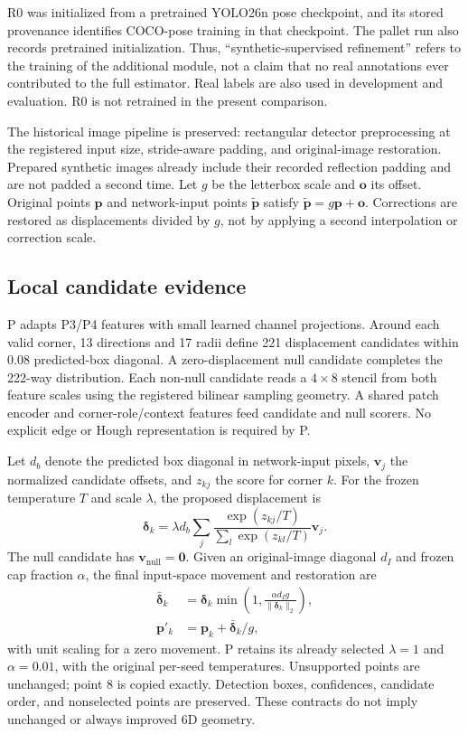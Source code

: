 \documentclass[journal]{IEEEtran}
\begin{document}
R0 was initialized from a pretrained YOLO26n pose checkpoint, and its stored provenance identifies COCO-pose training in that checkpoint. The pallet run also records pretrained initialization. Thus, ``synthetic-supervised refinement'' refers to the training of the additional module, not a claim that no real annotations ever contributed to the full estimator. Real labels are also used in development and evaluation. R0 is not retrained in the present comparison.

The historical image pipeline is preserved: rectangular detector preprocessing at the registered input size, stride-aware padding, and original-image restoration. Prepared synthetic images already include their recorded reflection padding and are not padded a second time. Let $g$ be the letterbox scale and $\mathbf{o}$ its offset. Original points $\mathbf{p}$ and network-input points $\tilde{\mathbf{p}}$ satisfy $\tilde{\mathbf{p}}=g\mathbf{p}+\mathbf{o}$. Corrections are restored as displacements divided by $g$, not by applying a second interpolation or correction scale.

\subsection{Local candidate evidence}
P adapts P3/P4 features with small learned channel projections. Around each valid corner, 13 directions and 17 radii define 221 displacement candidates within 0.08 predicted-box diagonal. A zero-displacement null candidate completes the 222-way distribution. Each non-null candidate reads a $4\times8$ stencil from both feature scales using the registered bilinear sampling geometry. A shared patch encoder and corner-role/context features feed candidate and null scorers. No explicit edge or Hough representation is required by P.

Let $d_b$ denote the predicted box diagonal in network-input pixels, $\mathbf{v}_j$ the normalized candidate offsets, and $z_{kj}$ the score for corner $k$. For the frozen temperature $T$ and scale $\lambda$, the proposed displacement is
\begin{equation}
\boldsymbol{\delta}_k=\lambda d_b\sum_j\frac{\exp(z_{kj}/T)}{\sum_l\exp(z_{kl}/T)}\mathbf{v}_j.
\end{equation}
The null candidate has $\mathbf{v}_{\mathrm{null}}=\mathbf{0}$. Given an original-image diagonal $d_I$ and frozen cap fraction $\alpha$, the final input-space movement and restoration are
\begin{align}
\bar{\boldsymbol{\delta}}_k&=\boldsymbol{\delta}_k\min\left(1,\frac{\alpha d_Ig}{\|\boldsymbol{\delta}_k\|_2}\right),\\
\mathbf{p}'_k&=\mathbf{p}_k+\bar{\boldsymbol{\delta}}_k/g,
\end{align}
with unit scaling for a zero movement. P retains its already selected $\lambda=1$ and $\alpha=0.01$, with the original per-seed temperatures. Unsupported points are unchanged; point 8 is copied exactly. Detection boxes, confidences, candidate order, and nonselected points are preserved. These contracts do not imply unchanged or always improved 6D geometry.
\end{document}
